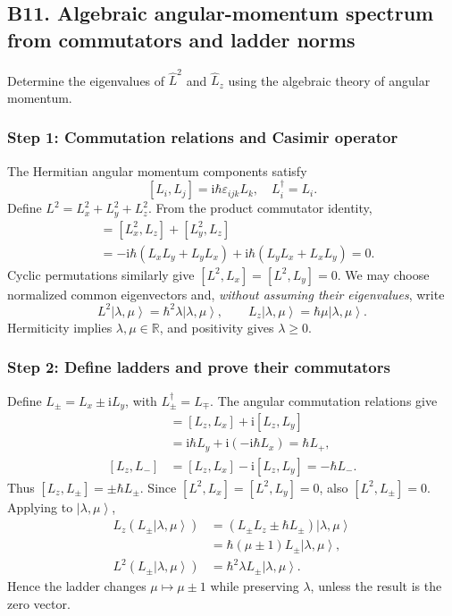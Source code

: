 \documentclass[11pt,a4paper]{article}
\newcommand{\iu}{\mathrm{i}}
\newcommand{\ket}[1]{\left|#1\right\rangle}
\newcommand{\R}{\mathbb R}
\begin{document}
\subsection{B11. Algebraic angular-momentum spectrum from commutators and ladder norms}
\begin{questionbox}Determine the eigenvalues of \(\hat L^2\) and \(\hat L_z\) using the algebraic theory of angular momentum.\end{questionbox}
\subsubsection*{Step 1: Commutation relations and Casimir operator}
The Hermitian angular momentum components satisfy
\begin{equation}\boxed{[L_i,L_j]=\iu\hbar\varepsilon_{ijk}L_k,\quad L_i^\dagger=L_i.}\end{equation}
Define \(L^2=L_x^2+L_y^2+L_z^2\). From the product commutator identity,
\begin{align}
[L^2,L_z]&=[L_x^2,L_z]+[L_y^2,L_z]\\
&=-\iu\hbar(L_xL_y+L_yL_x)+\iu\hbar(L_yL_x+L_xL_y)=0.
\end{align}
Cyclic permutations similarly give \([L^2,L_x]=[L^2,L_y]=0\). We may choose normalized common eigenvectors and, \emph{without assuming their eigenvalues}, write
\begin{equation}\boxed{L^2\ket{\lambda,\mu}=\hbar^2\lambda\ket{\lambda,\mu},\qquad L_z\ket{\lambda,\mu}=\hbar\mu\ket{\lambda,\mu}.}\end{equation}
Hermiticity implies \(\lambda,\mu\in\R\), and positivity gives \(\lambda\ge0\).

\subsubsection*{Step 2: Define ladders and prove their commutators}
Define \(L_\pm=L_x\pm\iu L_y\), with \(L_\pm^\dagger=L_\mp\). The angular commutation relations give
\begin{align}
[L_z,L_+]&=[L_z,L_x]+\iu[L_z,L_y]\\
&=\iu\hbar L_y+\iu(-\iu\hbar L_x)=\hbar L_+,\\
[L_z,L_-]&=[L_z,L_x]-\iu[L_z,L_y]=-\hbar L_-.
\end{align}
Thus \([L_z,L_\pm]=\pm\hbar L_\pm\). Since \([L^2,L_x]=[L^2,L_y]=0\), also \([L^2,L_\pm]=0\). Applying to \(\ket{\lambda,\mu}\),
\begin{align}
L_z(L_\pm\ket{\lambda,\mu})&=(L_\pm L_z\pm\hbar L_\pm)\ket{\lambda,\mu}\\
&=\hbar(\mu\pm1)L_\pm\ket{\lambda,\mu},\\
L^2(L_\pm\ket{\lambda,\mu})&=\hbar^2\lambda L_\pm\ket{\lambda,\mu}.
\end{align}
Hence the ladder changes \(\mu\mapsto\mu\pm1\) while preserving \(\lambda\), unless the result is the zero vector.
\end{document}
